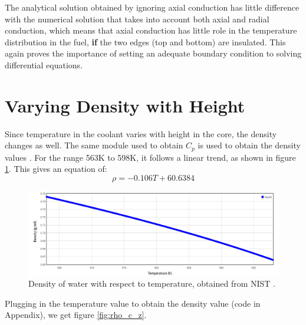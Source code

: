 \documentclass[12pt,letterpaper]{article}
\begin{document}
The analytical solution obtained by ignoring axial conduction has
little difference with the numerical solution that takes into account
both axial and radial conduction, which means that axial conduction
has little role in the temperature distribution in the fuel, \textbf{if}
the two edges (top and bottom) are insulated. This again proves the importance
of setting an adequate boundary condition to solving differential equations.

\section*{Varying Density with Height}
Since temperature in the coolant varies with height in the core,
the density changes as well. The same module used to obtain $C_p$
is used to obtain the density values \cite{romera_iapws:_2017}.
For the range 563K to 598K, it follows a linear trend, as shown
in figure \ref{fig:wat_den}.  This gives an equation of:
\[\rho = -0.106T + 60.6384\]


\begin{figure}[htbp!]
    \begin{center}
        \includegraphics[scale=0.7]{water_density.png}
    \end{center}
    \caption{Density of water with respect to temperature, obtained from NIST \cite{acree_phase_?}.}
    \label{fig:wat_den}
\end{figure}

Plugging in the temperature value to obtain the density value
(code in Appendix), we get figure \ref{fig:rho_c_z}.
\end{document}
